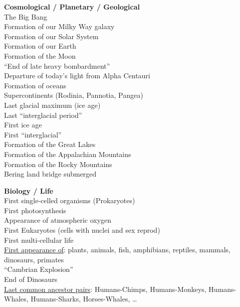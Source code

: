\documentclass[12pt]{article}
\begin{document}
\begin{multicols}{2}


\begin{tcolorbox}[colback=white,colframe=black,boxrule=0.5pt,arc=2mm,
  left=4pt,right=4pt,top=6pt,bottom=6pt,height=11cm,valign=center]
\textbf{Cosmological / Planetary / Geological}\\[4pt]
The Big Bang\\
Formation of our Milky Way galaxy\\
Formation of our Solar System\\
Formation of our Earth\\
Formation of the Moon\\
``End of late heavy bombardment''\\
Departure of today's light from Alpha Centauri\\
Formation of oceans\\
Supercontinents (Rodinia, Pannotia, Pangea)\\
Last glacial maximum (ice age)\\
Last ``interglacial period''\\
First ice age\\
First ``interglacial''\\
Formation of the Great Lakes\\
Formation of the Appalachian Mountains\\
Formation of the Rocky Mountains\\
Bering land bridge submerged


\vspace{1.5cm}


\end{tcolorbox}
\vspace{6pt}
\begin{tcolorbox}[colback=white,colframe=black,boxrule=0.5pt,arc=2mm,
  left=4pt,right=4pt,top=6pt,bottom=6pt,height=11cm,valign=center]
\textbf{Biology / Life}\\[4pt]
First single-celled organisms (Prokaryotes)\\
First photosynthesis\\
Appearance of atmospheric oxygen\\
First Eukaryotes (cells with nuclei and sex reprod)\\
First multi-cellular life\\
\underline{First appearance of}: plants, animals, fish, amphibians, reptiles, mammals, dinosaurs, primates\\
``Cambrian Explosion''\\
End of Dinosaurs\\
\underline{Last common ancestor pairs}: Humans-Chimps, Humans-Monkeys, Humans-Whales, Humans-Sharks, Horses-Whales, \ldots



\end{tcolorbox}
\end{multicols}
\end{document}
